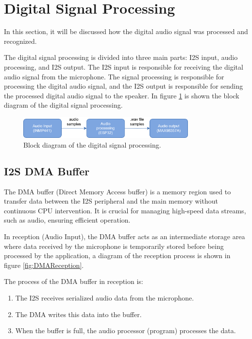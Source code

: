\section{Digital Signal Processing}

In this section, it will be discussed how the digital audio signal was processed and recognized. 

The digital signal processing is divided into three main parts: I2S input, audio processing, and I2S output. The I2S input is responsible for receiving the digital audio signal from the microphone. The signal processing is responsible for processing the digital audio signal, and the I2S output is responsible for sending the processed digital audio signal to the speaker. In figure \ref{fig:DigitalInterface} is shown the block diagram of the digital signal processing.

\begin{figure}[H]
    \centering
    \includegraphics[width=0.8\textwidth]{Images/audio_processing_diagraampng.png}
    \caption{Block diagram of the digital signal processing.}
    \label{fig:DigitalInterface}
\end{figure}

\subsection{I2S DMA Buffer}

The DMA buffer (Direct Memory Access buffer) is a memory region used to transfer data between the I2S peripheral and the main memory without continuous CPU intervention. It is crucial for managing high-speed data streams, such as audio, ensuring efficient operation.

In reception (Audio Input), the DMA buffer acts as an intermediate storage area where data received by the microphone is temporarily stored before being processed by the application, a diagram of the reception process is shown in figure \ref{fig:DMAReception}.

The process of the DMA buffer in reception is:
\begin{enumerate}
    \item The I2S receives serialized audio data from the microphone.
    \item The DMA writes this data into the buffer.
    \item When the buffer is full, the audio processor (program) processes the data.
\end{enumerate}

